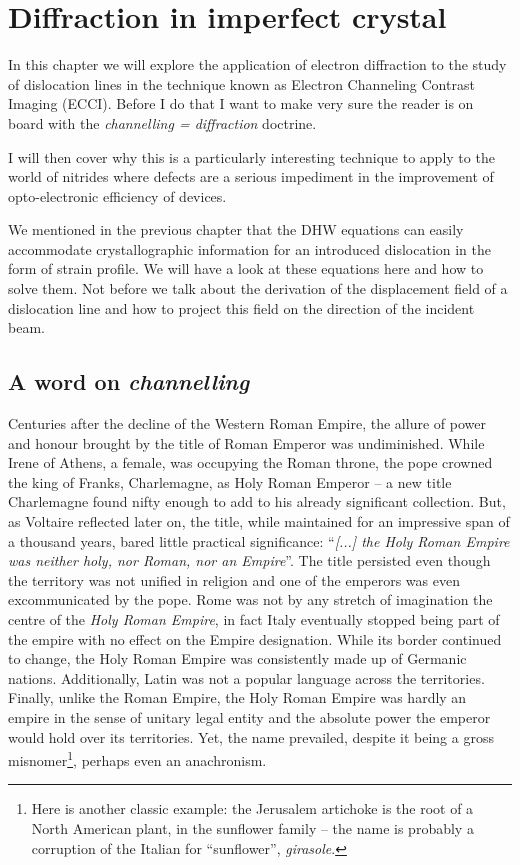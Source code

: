 \chapter{Diffraction in imperfect crystal}
\label{chap:ECCI}

In this chapter we will explore the application of electron diffraction to the study of dislocation lines in the technique known as Electron Channeling Contrast Imaging (ECCI). Before I do that I want to make very sure the reader is on board with the \emph{channelling = diffraction} doctrine.

I will then cover why this is a particularly interesting technique to apply to the world of nitrides where defects are a serious impediment in the improvement of opto-electronic efficiency of devices. 

We mentioned in the previous chapter that the DHW equations can easily accommodate crystallographic information for an introduced dislocation in the form of strain profile. We will have a look at these equations here and how to solve them. Not before we talk about the derivation of the displacement field of a dislocation line and how to project this field on the direction of the incident beam. 


\pagebreak



\section{A word on \textit{channelling}}
\label{sec:channelling}



Centuries after the decline of the Western Roman Empire, the allure of power and honour brought by the title of Roman Emperor was undiminished. While Irene of Athens, a female, was occupying the Roman throne, the pope crowned the king of Franks, Charlemagne, as Holy Roman Emperor -- a new title Charlemagne found nifty enough to add to his already significant collection. But, as Voltaire reflected later on, the title, while maintained for an impressive span of a thousand years, bared little practical significance: ``\textit{[...] the Holy Roman Empire was neither holy, nor Roman, nor an Empire}''. The title persisted even though the territory was not unified in religion and one of the emperors was even excommunicated by the pope. Rome was not by any stretch of imagination the centre of the \textit{Holy Roman Empire}, in fact Italy eventually stopped being part of the empire with no effect on the Empire designation. While its border continued to change, the Holy Roman Empire was consistently made up of Germanic nations. Additionally, Latin was not a popular language across the territories. Finally, unlike the Roman Empire, the Holy Roman Empire was hardly an empire in the sense of unitary legal entity and the absolute power the emperor would hold over its territories. Yet, the name prevailed, despite it being a gross misnomer\footnote{Here is another classic example: the Jerusalem artichoke is the root of a North American plant, in the sunflower family -- the name is probably a corruption of the Italian for ``sunflower'', \textit{girasole}.}, perhaps even an anachronism. 

